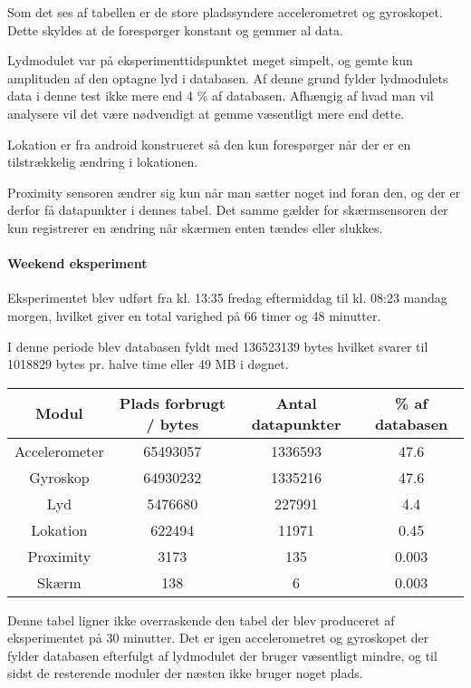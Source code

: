 Som det ses af tabellen er de store pladssyndere accelerometret og gyroskopet.
Dette skyldes at de forespørger konstant og gemmer al data.

Lydmodulet var på eksperimenttidspunktet meget simpelt, og gemte kun amplituden af den optagne lyd i databasen. 
Af denne grund fylder lydmodulets data i denne test ikke mere end 4 \% af databasen.
Afhængig af hvad man vil analysere vil det være nødvendigt at gemme væsentligt mere end dette.

Lokation er fra android konstrueret så den kun forespørger når der er en tilstrækkelig ændring i lokationen.

Proximity sensoren ændrer sig kun når man sætter noget ind foran den, og der er derfor få datapunkter i dennes tabel.
Det samme gælder for skærmsensoren der kun registrerer en ændring når skærmen enten tændes eller slukkes.	

\paragraph{Weekend eksperiment}

Eksperimentet blev udført fra kl. 13:35 fredag eftermiddag til kl. 08:23 mandag morgen, hvilket giver en total varighed på 66 timer og 48 minutter.

I denne periode blev databasen fyldt med 136523139 bytes hvilket svarer til 1018829 bytes pr. halve time eller 49 MB i døgnet.

\begin{tabular}{|c|c|c|c|}
	\hline Modul & Plads forbrugt / bytes & Antal datapunkter & \% af databasen \\
	\hline Accelerometer & 65493057     & 1336593    & 47.6 \\ 
	\hline Gyroskop & 64930232     & 1335216    & 47.6\\ 
	\hline Lyd & 5476680      & 227991     & 4.4 \\ 
	\hline Lokation & 622494 & 11971      & 0.45 \\ 
	\hline Proximity & 3173 & 135 & 0.003 \\ 
	\hline Skærm & 138           & 6          & 0.003 \\ 
	\hline 
\end{tabular} 

Denne tabel ligner ikke overraskende den tabel der blev produceret af eksperimentet på 30 minutter.
Det er igen accelerometret og gyroskopet der fylder databasen efterfulgt af lydmodulet der bruger væsentligt mindre, og til sidst de resterende moduler der næsten ikke bruger noget plads.

